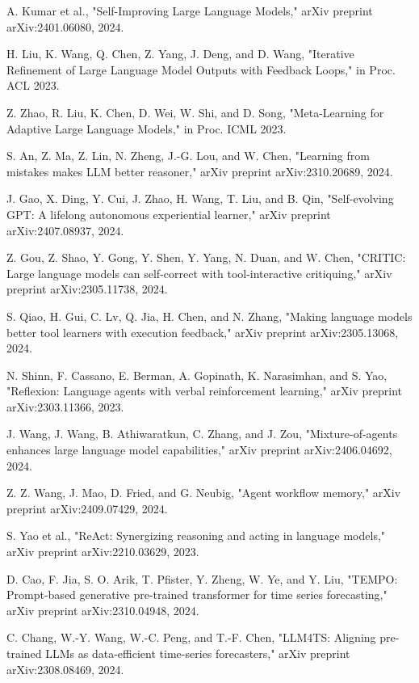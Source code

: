 \documentclass[conference]{IEEEtran}
\begin{document}
\begin{thebibliography}{00}
 A. Kumar et al., "Self-Improving Large Language Models," arXiv preprint arXiv:2401.06080, 2024.

 H. Liu, K. Wang, Q. Chen, Z. Yang, J. Deng, and D. Wang, "Iterative Refinement of Large Language Model Outputs with Feedback Loops," in Proc. ACL 2023.

 Z. Zhao, R. Liu, K. Chen, D. Wei, W. Shi, and D. Song, "Meta-Learning for Adaptive Large Language Models," in Proc. ICML 2023.

 S. An, Z. Ma, Z. Lin, N. Zheng, J.-G. Lou, and W. Chen, "Learning from mistakes makes LLM better reasoner," arXiv preprint arXiv:2310.20689, 2024.

 J. Gao, X. Ding, Y. Cui, J. Zhao, H. Wang, T. Liu, and B. Qin, "Self-evolving GPT: A lifelong autonomous experiential learner," arXiv preprint arXiv:2407.08937, 2024.

 Z. Gou, Z. Shao, Y. Gong, Y. Shen, Y. Yang, N. Duan, and W. Chen, "CRITIC: Large language models can self-correct with tool-interactive critiquing," arXiv preprint arXiv:2305.11738, 2024.

 S. Qiao, H. Gui, C. Lv, Q. Jia, H. Chen, and N. Zhang, "Making language models better tool learners with execution feedback," arXiv preprint arXiv:2305.13068, 2024.

 N. Shinn, F. Cassano, E. Berman, A. Gopinath, K. Narasimhan, and S. Yao, "Reflexion: Language agents with verbal reinforcement learning," arXiv preprint arXiv:2303.11366, 2023.

 J. Wang, J. Wang, B. Athiwaratkun, C. Zhang, and J. Zou, "Mixture-of-agents enhances large language model capabilities," arXiv preprint arXiv:2406.04692, 2024.

 Z. Z. Wang, J. Mao, D. Fried, and G. Neubig, "Agent workflow memory," arXiv preprint arXiv:2409.07429, 2024.

 S. Yao et al., "ReAct: Synergizing reasoning and acting in language models," arXiv preprint arXiv:2210.03629, 2023.

 D. Cao, F. Jia, S. O. Arik, T. Pfister, Y. Zheng, W. Ye, and Y. Liu, "TEMPO: Prompt-based generative pre-trained transformer for time series forecasting," arXiv preprint arXiv:2310.04948, 2024.

 C. Chang, W.-Y. Wang, W.-C. Peng, and T.-F. Chen, "LLM4TS: Aligning pre-trained LLMs as data-efficient time-series forecasters," arXiv preprint arXiv:2308.08469, 2024.


\end{thebibliography}
\end{document}

